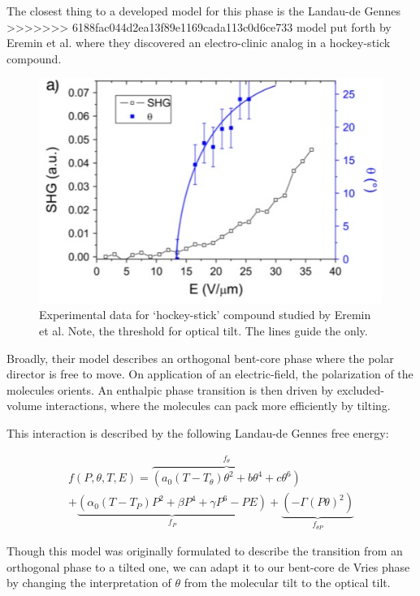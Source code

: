 \documentclass[aagreenthesis]{subfiles}
\begin{document}
The closest thing to a developed model for this phase is the Landau-de Gennes
>>>>>>> 6188fac044d2ea13f89e1169cada113c0d6ce733
model put forth by Eremin et al.\cite{eremin2008electrically} where they
discovered an electro-clinic analog in a hockey-stick compound. 
\begin{figure}
    \centering
    \includegraphics[width=\textwidth]{./figs/pal30/fromPapers/tiltVfield.jpg}
    \caption{\label{fig:achiralTilt} Experimental data for `hockey-stick'
    compound studied by Eremin et al.\cite{eremin2008electrically} Note, the threshold for optical tilt. The lines guide the only.}
\end{figure}
Broadly, their model describes an orthogonal bent-core phase where the polar
director is free to move. On application of an electric-field, the polarization
of the molecules orients. An enthalpic phase transition
is then driven by excluded-volume interactions, where the molecules can pack
more efficiently by tilting. 

This interaction is described by the following Landau-de Gennes free energy:

\begin{multline}
    f(P,\theta,T,E) = \overbrace{\left(a_0(T-T_\theta)\theta^2+b\theta^4+c\theta^6
    \right)}^{f_\theta}\\
    + \underbrace{\left( \alpha_0(T-T_P)P^2+\beta P^4 + \gamma P^6 -PE
            \right)}_{f_P} +\underbrace{\left(
    -\Gamma (P \theta)^2 \right)}_{f_{\theta P}}
\end{multline}

Though this model was originally formulated to describe the transition from an
orthogonal phase to a tilted one, we can adapt it to our bent-core de Vries
phase by changing the interpretation of $\theta$ from the molecular tilt to the
optical tilt.
\end{document}
